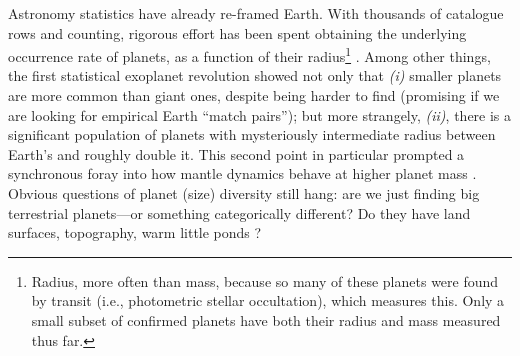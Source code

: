 Astronomy statistics have already re-framed Earth. With thousands of catalogue rows and counting, rigorous effort has been spent obtaining the underlying occurrence rate of planets, as a function of their radius\footnote{Radius, more often than mass, because so many of these planets were found by transit (i.e., photometric stellar occultation), which measures this. Only a small subset of confirmed planets have both their radius and mass measured thus far.} \citep[e.g.,][]{foreman-mackey_exoplanet_2014, rogers_most_2015, herman_revisiting_2019, bryson_probabilistic_2020, kunimoto_searching_2020, kunimoto_combining_2021, bryson_occurrence_2021, jin_relative_2021}. Among other things, the first statistical exoplanet revolution showed not only that \textit{(i)} smaller planets are more common than giant ones, despite being harder to find (promising if we are looking for empirical Earth ``match pairs''); but more strangely, \textit{(ii)}, %
there is a significant population of planets with mysteriously intermediate radius between Earth's and roughly double it. This second point in particular prompted a synchronous foray into how mantle dynamics behave at higher planet mass \citep[e.g.,][]{kite2009geodynamics, valencia_convection_2009, gaidos_thermodynamic_2010, karato_rheological_2011, foley_conditions_2012, stamenkovic_influence_2012, kameyama_stability_2013, tackley_mantle_2013}. Obvious questions of planet (size) diversity still hang: are we just finding big terrestrial planets---or something categorically different? Do they have land surfaces, topography, warm little ponds \citep{darwin_ponds}?

